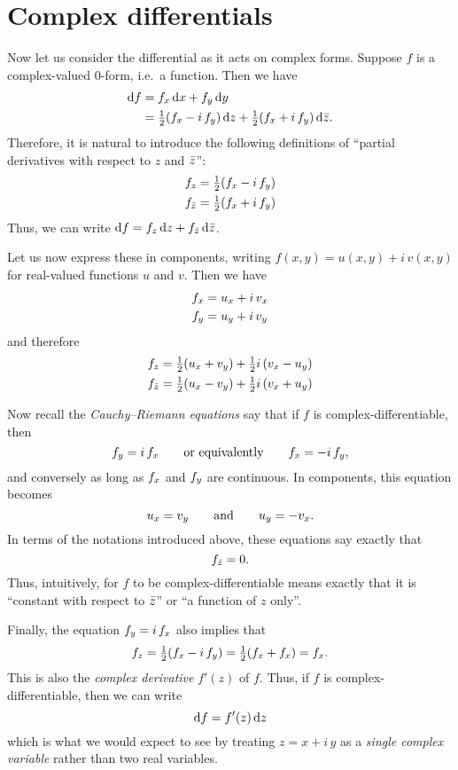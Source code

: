 \documentclass[12pt]{amsart}
\begin{document}
\section{Complex differentials}
\label{sec:complex-differentials}

Now let us consider the differential as it acts on complex forms.
Suppose $f$ is a complex-valued 0-form, i.e.\ a function.
Then we have
\begin{align*}
  {\ensuremath{\mathrm{d} f}} &= {f}_{x} \, {\mathrm{d} x} + {f}_{y}\,{\mathrm{d} y}\\
  &= \textstyle\frac{1}{2} ({f}_{x} - i\, {f}_{y})\,{\mathrm{d} z} + \textstyle\frac{1}{2} ({f}_{x} + i\, {f}_{y})\,{\mathrm{d} \bar{z}}.
\end{align*}
Therefore, it is natural to introduce the following definitions of ``partial derivatives with respect to $z$ and $\bar{z}$'':
\begin{align*}
  {f}_{z} &= \textstyle\frac{1}{2} ({f}_{x} - i\, {f}_{y})\\
  {f}_{\bar{z}} &= \textstyle\frac{1}{2} ({f}_{x} + i\, {f}_{y})
\end{align*}
Thus, we can write ${\mathrm{d} f} = {f}_{z} \,{\mathrm{d} z} + {f}_{\bar{z}} \,{\mathrm{d} \bar{z}}$.

Let us now express these in components, writing $f(x,y) = u(x,y) + i\,v(x,y)$ for real-valued functions $u$ and $v$.
Then we have
\begin{align*}
  {f}_{x} &= {u}_{x} + i\, {v}_{x}\\
  {f}_{y} &= {u}_{y} + i\, {v}_{y}
\end{align*}
and therefore
\begin{align*}
  {f}_{z} &= \textstyle\frac{1}{2} ({u}_{x} + {v}_{y}) + \textstyle\frac{1}{2} i\, ({v}_{x} - {u}_{y})\\
  {f}_{\bar{z}} &= \textstyle\frac{1}{2} ({u}_{x} - {v}_{y}) + \textstyle\frac{1}{2} i\, ({v}_{x} + {u}_{y})
\end{align*}

Now recall the \emph{Cauchy--Riemann equations} say that if $f$ is complex-differentiable, then
\[ {f}_{y} = i\,{f}_{x} \qquad\text{or equivalently}\qquad {f}_{x} = - i\,{f}_{y},\]
and conversely as long as ${f}_{x}$ and ${f}_{y}$ are continuous.
In components, this equation becomes
\[ {u}_{x} = {v}_{y} \qquad\text{and}\qquad {u}_{y} = - {v}_{x}. \]
In terms of the notations introduced above, these equations say exactly that
\[ {f}_{\bar{z}} = 0. \]
Thus, intuitively, for $f$ to be complex-differentiable means exactly that it is ``constant with respect to $\bar{z}$'' or ``a function of $z$ only''.

Finally, the equation ${f}_{y} = i\,{f}_{x}$ also implies that
\[ {f}_{z} = \textstyle\frac{1}{2}({f}_{x} - i\,{f}_{y}) = \textstyle\frac{1}{2} ({f}_{x} + {f}_{x}) = {f}_{x}.\]
This is also the \emph{complex derivative} $f'(z)$ of $f$.
Thus, if $f$ is complex-differentiable, then we can write
\[ {\mathrm{d} f} = f'(z) \,{\mathrm{d} z} \]
which is what we would expect to see by treating $z = x+i\,y$ as a \emph{single complex variable} rather than two real variables.
\end{document}
